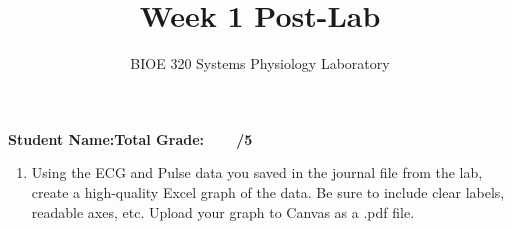\documentclass{article}
\title{Week 1 Post-Lab}
\author{BIOE 320 Systems Physiology Laboratory}
\date{}
\begin{document}
\maketitle
\large

\textbf{Student Name:}\hfill 	\textbf{Total Grade:\ \ \ \ /5}\vspace{0.5cm}

\begin{enumerate}
	\item Using the ECG and Pulse data you saved in the journal file from the lab, create a high-quality Excel graph of the data. Be sure to include clear labels, readable axes, etc. Upload your graph to Canvas as a .pdf file.
\end{enumerate}
\end{document}
